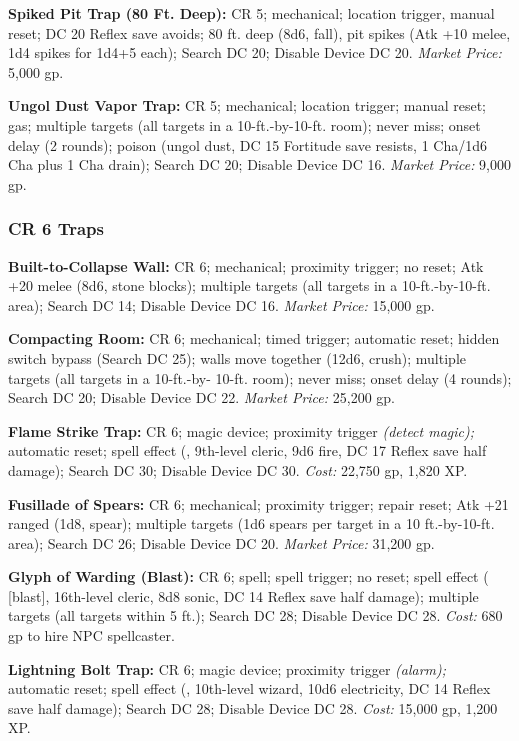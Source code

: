 \textbf{Spiked Pit Trap (80 Ft. Deep):} CR 5; mechanical; location trigger, manual 
reset; DC 20 Reflex save avoids; 80 ft. deep (8d6, fall), pit spikes (Atk +10 melee, 
1d4 spikes for 1d4+5 each); Search DC 20; Disable Device DC 20. \textit{Market 
Price:} 5,000 gp. 

\textbf{Ungol Dust Vapor Trap:} CR 5; mechanical; location trigger; manual reset; 
gas; multiple targets (all targets in a 10-ft.-by-10-ft. room); never miss; onset 
delay (2 rounds); poison (ungol dust, DC 15 Fortitude save resists, 1 Cha/1d6 Cha 
plus 1 Cha drain); Search DC 20; Disable Device DC 16. \textit{Market Price:} 9,000 
gp.

\subsubsection{CR 6 Traps }

\textbf{Built-to-Collapse Wall:} CR 6; mechanical; proximity trigger; no reset; 
Atk +20 melee (8d6, stone blocks); multiple targets (all targets in a 10-ft.-by-10-ft. 
area); Search DC 14; Disable Device DC 16. \textit{Market Price:} 15,000 gp.

\textbf{Compacting Room:} CR 6; mechanical; timed trigger; automatic reset; hidden 
switch bypass (Search DC 25); walls move together (12d6, crush); multiple targets 
(all targets in a 10-ft.-by- 10-ft. room); never miss; onset delay (4 rounds); 
Search DC 20; Disable Device DC 22. \textit{Market Price:} 25,200 gp.

\textbf{Flame Strike Trap:} CR 6; magic device; proximity trigger 
\textit{(detect magic); }automatic reset; spell effect (, 9th-level 
cleric, 9d6 fire, DC 17 Reflex save half damage); Search DC 30; Disable Device 
DC 30. \textit{Cost:} 22,750 gp, 1,820 XP.

\textbf{Fusillade of Spears:} CR 6; mechanical; proximity trigger; repair reset; 
Atk +21 ranged (1d8, spear); multiple targets (1d6 spears per target in a 10 ft.-by-10-ft. 
area); Search DC 26; Disable Device DC 20. \textit{Market Price:} 31,200 gp.

\textbf{Glyph of Warding (Blast):} CR 6; spell; spell trigger; 
no reset; spell effect ( [blast], 16th-level cleric, 8d8 
sonic, DC 14 Reflex save half damage); multiple targets (all targets within 5 ft.); 
Search DC 28; Disable Device DC 28. \textit{Cost:} 680 gp to hire NPC spellcaster.

\textbf{Lightning Bolt Trap:} CR 6; magic device; proximity trigger 
\textit{(alarm); }automatic reset; spell effect (, 10th-level 
wizard, 10d6 electricity, DC 14 Reflex save half damage); Search DC 28; Disable 
Device DC 28. \textit{Cost:} 15,000 gp, 1,200 XP.

